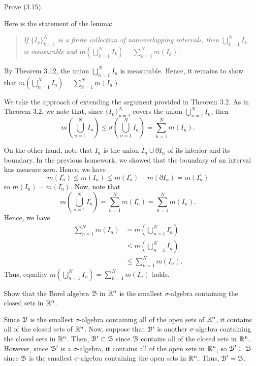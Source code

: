 \begin{problem}
  Prove (3.15).
\end{problem}
\begin{solution}
  Here is the statement of the lemma:
  \begin{quote}
    \emph{If ${\{I_k\}}_{k=1}^{N}$ is a finite collection of nonoverlapping
      intervals, then $\bigcup_{k=1}^NI_k$ is measurable and
      $m\left(\bigcup_{k=1}^NI_k\right)=\sum_{k=1}^Nm(I_k)$.}
  \end{quote}
  By Theorem 3.12, the union $\bigcup_{n=1}^N I_n$ is measurable. Hence, it
  remains to show that
  $m\left(\bigcup_{n=1}^NI_n\right)=\sum_{n=1}^Nm(I_n)$.

  We take the approach of extending the argument provided in Theorem
  3.2. As in Theorem 3.2, we note that, since ${\{I_n\}}_{n=1}^N$ covers
  the union $\bigcup_{n=1}^N I_n$, then
  \[
    m\left(\bigcup_{n=1}^N I_n\right)\leq \sigma%
    \left(\bigcup_{n=1}^N I_n\right)=\sum_{n=1}^N m(I_n).
  \]

  On the other hand, note that $I_n$ is the union
  $I_n^\circ\cup\partial I_n$ of its interior and its boundary. In the
  previous homework, we showed that the boundary of an interval has measure
  zero. Hence, we have
  \[
    m(I_n^\circ)\leq m(I_n)\leq m(I_n^\circ)+m(\partial I_n)=m(I_n^\circ)
  \]
  so $m(I_n)=m(I_n^\circ)$. Now, note that
  \[
    m\left(\bigcup_{n=1}^N I_n^\circ\right)=%
    \sum_{n=1}^N m(I_n^\circ)=%
    \sum_{n=1}^N m(I_n).
  \]
  Hence, we have
  \begin{align*}
    \sum_{n=1}^N m(I_n)
    &=m\left(\bigcup_{n=1}^N I_n^\circ\right)\\
    &\leq m\left(\bigcup_{n=1}^N I_n\right)\\
    &\leq \sum_{n=1}^N m(I_n).
  \end{align*}
  Thus, equality $m\left(\bigcup_{n=1}^NI_n\right)=\sum_{n=1}^Nm(I_n)$
  holds.
\end{solution}

\begin{problem}
  Show that the Borel algebra $\mathcal{B}$ in $\mathbb{R}^n$ is the smallest
  $\sigma$-algebra containing the closed sets in $\mathbb{R}^n$.
\end{problem}
\begin{solution}
  Since $\mathcal{B}$ is the smallest $\sigma$-algebra containing all of the open
  sets of $\mathbb{R}^n$, it contains all of the closed sets of $\mathbb{R}^n$. Now,
  suppose that $\mathcal{B}'$ is another $\sigma$-algebra containing the closed
  sets in $\mathbb{R}^n$. Then, $\mathcal{B}'\subset\mathcal{B}$ since $\mathcal{B}$ contains all
  of the closed sets in $\mathbb{R}^n$. However, since $\mathcal{B}'$ is a
  $\sigma$-algebra, it contains all of the open sets in $\mathbb{R}^n$, so
  $\mathcal{B}'\subset\mathcal{B}$ since $\mathcal{B}$ is the smallest $\sigma$-algebra
  containing the open sets in $\mathbb{R}^n$. Thus, $\mathcal{B}'=\mathcal{B}$.
\end{solution}

